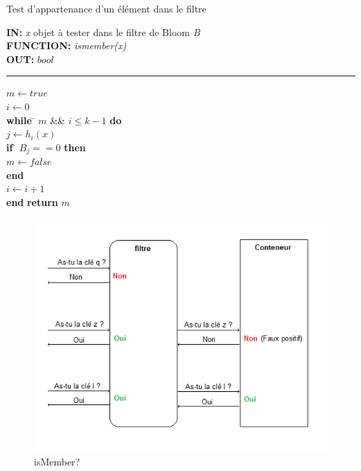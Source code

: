 \begin{algorithme}
	Test d'appartenance d'un élément dans le filtre
\end{algorithme}

\begin{flushleft}
	\begin{framed}
		\textbf{IN:} \emph{x} objet à tester dans le filtre de Bloom \textit{B}\\
		\textbf{FUNCTION:} \textit{ismember(x)}\\
		\textbf{OUT:} $bool$

		\noindent\rule{\linewidth}{0.5pt}

		\begin{tabbing}
			$m \leftarrow true$\\
			$i \leftarrow 0$\\
			\textbf{while} \= $m$ \&\& $i \leq k - 1$ \textbf{do}\\
					\> $j \leftarrow h_i(x)$\\
					\> \textbf{if} \= $B_j == 0$ \textbf{then}\\
					\> \> $m \leftarrow false$\\
					\> \textbf{end}\\
					\> $i \leftarrow i + 1$\\
			\textbf{end}
			\textbf{return} $m$\\
	    	\end{tabbing}		
	\end{framed}
\end{flushleft}

\begin{figure}[!htbp]
	\centering
	\includegraphics[width =12cm]{ismember.png}
	\caption{isMember?}
\end{figure}	

	
	
	
	
	
	
	
	
	
	
	
	
	
	
	
	
	
	
	
	
	